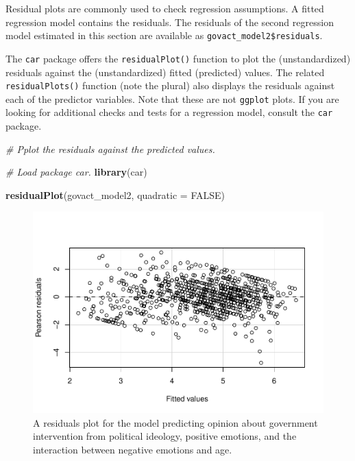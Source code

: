 \documentclass[doc,floatsintext]{apa6}
\newenvironment{Shaded}{\begin{snugshade}}{\end{snugshade}}
\newcommand{\KeywordTok}[1]{\textcolor[rgb]{0.13,0.29,0.53}{\textbf{#1}}}
\newcommand{\DataTypeTok}[1]{\textcolor[rgb]{0.13,0.29,0.53}{#1}}
\newcommand{\CommentTok}[1]{\textcolor[rgb]{0.56,0.35,0.01}{\textit{#1}}}
\newcommand{\OtherTok}[1]{\textcolor[rgb]{0.56,0.35,0.01}{#1}}
\newcommand{\NormalTok}[1]{#1}
\begin{document}
Residual plots are commonly used to check regression assumptions. A
fitted regression model contains the residuals. The residuals of the
second regression model estimated in this section are available as
\texttt{govact\_model2\$residuals}.

The \texttt{car} package offers the \texttt{residualPlot()} function to
plot the (unstandardized) residuals against the (unstandardized) fitted
(predicted) values. The related \texttt{residualPlots()} function (note
the plural) also displays the residuals against each of the predictor
variables. Note that these are not \texttt{ggplot} plots. If you are
looking for additional checks and tests for a regression model, consult
the \texttt{car} package.

\begin{Shaded}
\begin{Highlighting}[]
\CommentTok{# Pplot the residuals against the predicted values.}

\CommentTok{# Load package car.}
\KeywordTok{library}\NormalTok{(car)}

\KeywordTok{residualPlot}\NormalTok{(govact_model2,}
             \DataTypeTok{quadratic =} \OtherTok{FALSE}\NormalTok{)}
\end{Highlighting}
\end{Shaded}

\begin{figure}[H]
\centering
\includegraphics{HelpMyCollaboratorUsesR_files/figure-latex/plotresiduals-1.pdf}
\caption{\label{fig:plotresiduals}A residuals plot for the model predicting
opinion about government intervention from political ideology, positive
emotions, and the interaction between negative emotions and age.}
\end{figure}
\end{document}
